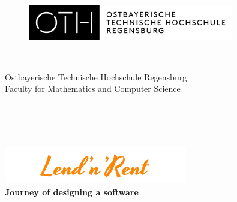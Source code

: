 \thispagestyle{empty}



\begin{figure}[t]
\centering
\includegraphics[width=0.8\textwidth]{abb/Logo_OTH_Regensburg}


\end{figure}


\begin{verbatim}


\end{verbatim}

\begin{center}
\Large{Ostbayerische Technische Hochschule Regensburg}\\
\Large{Faculty for Mathematics and Computer Science}
\end{center}


\begin{verbatim}




\end{verbatim}
\begin{center}
\doublespacing
\includegraphics[width=0.6\textwidth]{abb/Logo}\\
\textbf{\LARGE{Journey of designing a software}}\\
\singlespacing
\begin{verbatim}

\end{verbatim}
\end{center}
\begin{verbatim}

\end{verbatim}


